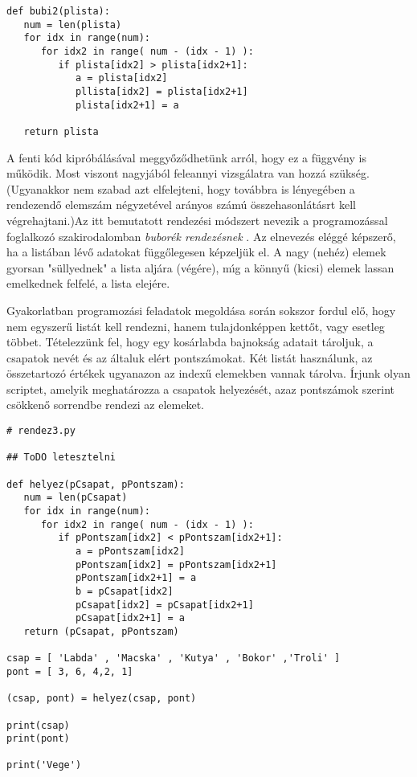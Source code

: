 \documentclass[12pt]{article}
\newcounter{feladat}
\newcounter{megold}
\begin{document}
\begin{Verbatim}[fontsize=\small]
def bubi2(plista):
   num = len(plista)
   for idx in range(num):
      for idx2 in range( num - (idx - 1) ):
         if plista[idx2] > plista[idx2+1]:
            a = plista[idx2]
            pllista[idx2] = plista[idx2+1]
            plista[idx2+1] = a

   return plista
\end{Verbatim}

\noindent A fenti k\'od kipr\'ob\'al\'as\'aval meggy\H{o}z\H{o}dhet\"unk arr\'ol, hogy ez a f\"uggv\'eny is 
m\H{u}k\"o\-dik. Most viszont nagyj\'ab\'ol feleannyi vizsg\'alatra van hozz\'a sz\"uks\'eg. (Ugyanakkor nem 
szabad azt elfelejteni, hogy tov\'abbra is l\'enyeg\'eben a rendezend\H{o} elemsz\'am n\'egyzet\'evel 
ar\'anyos sz\'am\'u \"osszehasonl\'at\'asrt kell v\'egrehajtani.)Az itt bemutatott rendez\'esi m\'odszert 
nevezik a programoz\'assal foglalkoz\'o szakirodalomban {\sl bubor\'ek rendez\'esnek} . 
Az elnevez\'es 
el\'egg\'e k\'epszer\H{o}, ha a list\'aban l\'ev\H{o} adatokat f\"ugg\H{o}legesen k\'epzelj\"uk el. A 
nagy (neh\'ez) elemek gyorsan "s\"ullyednek" a lista alj\'ara (v\'eg\'ere), m\'{\i}g a k\"onny\H{u} 
(kicsi) elemek lassan emelkednek felfel\'e, a lista elej\'ere.

Gyakorlatban programoz\'asi feladatok megold\'asa sor\'an sokszor fordul el\H{o}, hogy nem egyszer\H{u} list\'at 
kell rendezni, hanem tulajdonk\'eppen kett\H{o}t, vagy esetleg t\"obbet. T\'etelezz\"unk fel, hogy egy kos\'arlabda 
bajnoks\'ag adatait t\'aroljuk, a csapatok nev\'et \'es az \'altaluk el\'ert pontsz\'amokat. K\'et list\'at haszn\'alunk, 
az 
\"osszetartoz\'o \'ert\'ekek ugyanazon az index\H{u} elemekben vannak t\'arolva. \'Irjunk olyan scriptet, amelyik 
meghat\'arozza a csapatok helyez\'es\'et, azaz pontsz\'amok szerint cs\"okken\H{o} sorrendbe rendezi az elemeket.


\begin{Verbatim}[fontsize=\small]
# rendez3.py

## ToDO letesztelni

def helyez(pCsapat, pPontszam):
   num = len(pCsapat)
   for idx in range(num):
      for idx2 in range( num - (idx - 1) ):
         if pPontszam[idx2] < pPontszam[idx2+1]:
            a = pPontszam[idx2]
            pPontszam[idx2] = pPontszam[idx2+1]
            pPontszam[idx2+1] = a
            b = pCsapat[idx2]
            pCsapat[idx2] = pCsapat[idx2+1]
            pCsapat[idx2+1] = a
   return (pCsapat, pPontszam)

csap = [ 'Labda' , 'Macska' , 'Kutya' , 'Bokor' ,'Troli' ]
pont = [ 3, 6, 4,2, 1]

(csap, pont) = helyez(csap, pont)

print(csap)
print(pont)

print('Vege')   
\end{Verbatim}
\end{document}
